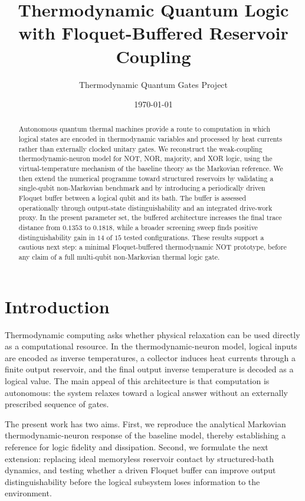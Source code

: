 \documentclass[11pt]{article}
\title{Thermodynamic Quantum Logic with Floquet-Buffered Reservoir Coupling}
\author{Thermodynamic Quantum Gates Project}
\date{\today}
\begin{document}
\maketitle

\begin{abstract}
Autonomous quantum thermal machines provide a route to computation in which logical
states are encoded in thermodynamic variables and processed by heat currents rather than
externally clocked unitary gates.  We reconstruct the weak-coupling thermodynamic-neuron
model for NOT, NOR, majority, and XOR logic, using the virtual-temperature mechanism of
the baseline theory as the Markovian reference.  We then extend the numerical programme
toward structured reservoirs by validating a single-qubit non-Markovian benchmark and by
introducing a periodically driven Floquet buffer between a logical qubit and its bath.  The
buffer is assessed operationally through output-state distinguishability and an integrated
drive-work proxy.  In the present parameter set, the buffered architecture increases the
final trace distance from $0.1353$ to $0.1818$, while a broader screening sweep finds
positive distinguishability gain in $14$ of $15$ tested configurations.  These results support
a cautious next step: a minimal Floquet-buffered thermodynamic NOT prototype, before any
claim of a full multi-qubit non-Markovian thermal logic gate.
\end{abstract}

\section{Introduction}

Thermodynamic computing asks whether physical relaxation can be used directly as a
computational resource.  In the thermodynamic-neuron model, logical inputs are encoded as
inverse temperatures, a collector induces heat currents through a finite output reservoir,
and the final output inverse temperature is decoded as a logical value.  The main appeal of
this architecture is that computation is autonomous: the system relaxes toward a logical
answer without an externally prescribed sequence of gates.

The present work has two aims.  First, we reproduce the analytical Markovian
thermodynamic-neuron response of the baseline model, thereby establishing a reference for
logic fidelity and dissipation.  Second, we formulate the next extension: replacing ideal
memoryless reservoir contact by structured-bath dynamics, and testing whether a driven
Floquet buffer can improve output distinguishability before the logical subsystem loses
information to the environment.
\end{document}
